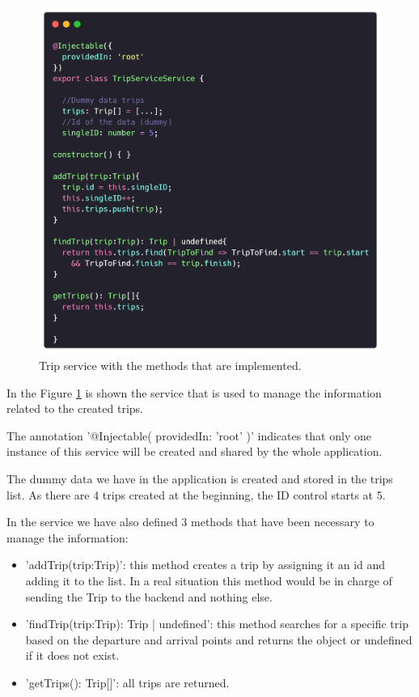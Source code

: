 \documentclass{article}
\begin{document}
    \begin{figure}[h]
      \centering
      \includegraphics[width=1\columnwidth]{figures/TripService.service.ts.png}
      \caption{Trip service with the methods that are implemented.\label{fig:TripService.service.ts.png}}
      \end{figure}

    In the Figure \ref{fig:TripService.service.ts.png} is shown the service that is used to manage the information related to the created trips. 

    The annotation '@Injectable({ providedIn: 'root' })' indicates that only one instance of this service will be created and shared by the whole application.

    The dummy data we have in the application is created and stored in the trips list. As there are 4 trips created at the beginning, the ID control starts at 5.

    In the service we have also defined 3 methods that have been necessary to manage the information:

    \begin{itemize}
      \item 'addTrip(trip:Trip)': this method creates a trip by assigning it an id and adding it to the list. In a real situation this method would be in charge of sending the Trip to the backend and nothing else.
      \item 'findTrip(trip:Trip): Trip | undefined': this method searches for a specific trip based on the departure and arrival points and returns the object or undefined if it does not exist.
      \item 'getTrips(): Trip[]': all trips are returned.
    \end{itemize}
\end{document}
